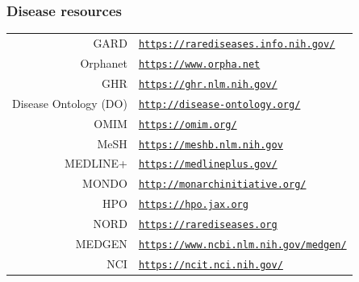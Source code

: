 ﻿\documentclass[anchorcolor=blue,linkcolor=blue]{beamer}
\begin{document}
\begin{frame}
  \frametitle{Disease resources}
  \begin{center}
    \begin{tabular}{rl}
      GARD &
      \href{https://rarediseases.info.nih.gov/}{\texttt{https://rarediseases.info.nih.gov/}}\\
      Orphanet &
      \href{https://www.orpha.net}{\texttt{https://www.orpha.net}}\\
      GHR&
      \href{https://ghr.nlm.nih.gov/}{\texttt{https://ghr.nlm.nih.gov/}}\\
      Disease Ontology (DO) &
      \href{http://disease-ontology.org/}{\texttt{http://disease-ontology.org/}}\\
      OMIM & \href{https://omim.org/}{\texttt{https://omim.org/}}\\
      MeSH &
      \href{https://meshb.nlm.nih.gov}{\texttt{https://meshb.nlm.nih.gov}}\\
      MEDLINE+ &
      \href{https://medlineplus.gov/}{\texttt{https://medlineplus.gov/}}\\
      MONDO &
      \href{http://monarchinitiative.org/}{\texttt{http://monarchinitiative.org/}}\\
      HPO & \href{https://hpo.jax.org}{\texttt{https://hpo.jax.org}}\\
      NORD & \href{https://rarediseases.org}{\texttt{https://rarediseases.org}}\\
      MEDGEN & \href{https://www.ncbi.nlm.nih.gov/medgen/}{\texttt{https://www.ncbi.nlm.nih.gov/medgen/}}\\
      NCI & \href{https://ncit.nci.nih.gov/}{\texttt{https://ncit.nci.nih.gov/}}\\
    \end{tabular}
  \end{center}
\end{frame}
\end{document}

